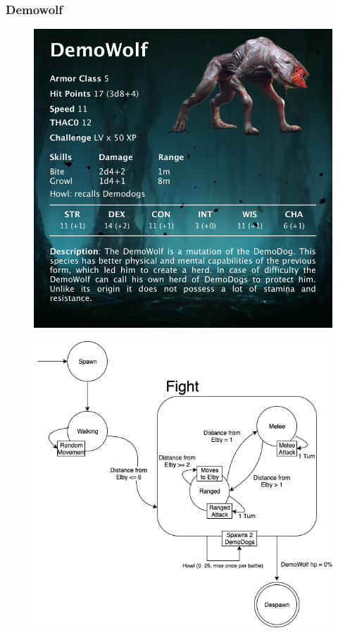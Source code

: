 \subsubsection{Demowolf}
\vspace*{0.3cm}
\begin{figure}[H]
	\centering
	\includegraphics[width=0.9\linewidth]{images/visual_stats/demowolf.png}
\end{figure}
\newpage
\begin{figure}[H]
	\centering
	\includegraphics[width=0.7\linewidth]{images/graphs/fsa/fsa_demowolf.png}
\end{figure}
\vspace*{4mm}

